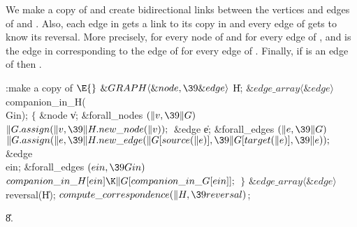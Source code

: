 We make  a copy of  and create bidirectional links
between the
vertices and edges of  and .
Also, each edge in  gets a link to its copy in  and every
edge
of  gets to know its reversal. More precisely,  for every
node  of  and  for every edge 
of , and
 is the edge in  corresponding to the
edge
 of  for every edge  of .
Finally, if  is
an edge of  then .



\Y\B\4:make  a copy of \X${}\E{}$\6
$\&{GRAPH}\langle\&{node},\39\&{edge}\rangle{}$ \|H;\6
${}\&{edge\_array}\langle\&{edge}\rangle{}$ \\{companion\_in\_H}(\\{Gin});\7
${}\{{}$\1\6
\&{node} \|v;\7
\&{forall\_nodes} ${}(\|v,\39\|G){}$\1\5
${}\|G.\\{assign}(\|v,\39\|H.\\{new\_node}(\|v));{}$\2\7
\&{edge} \|e;\7
\&{forall\_edges} ${}(\|e,\39\|G){}$\1\5
${}\|G.\\{assign}(\|e,\39\|H.\\{new\_edge}(\|G[\\{source}(\|e)],\39\|G[%
\\{target}(\|e)],\39\|e));{}$\2\7
\&{edge} \\{ein};\7
\&{forall\_edges} ${}(\\{ein},\39\\{Gin}){}$\1\5
${}\\{companion\_in\_H}[\\{ein}]\K\|G[\\{companion\_in\_G}[\\{ein}]];{}$\2\6
\4${}\}{}$\2\7
${}\&{edge\_array}\langle\&{edge}\rangle{}$ \\{reversal}(\|H);\7
${}\\{compute\_correspondence}(\|H,\39\\{reversal}){}$;\par
\U8.\fi

